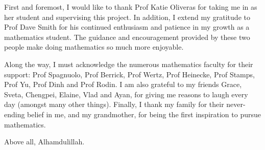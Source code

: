 \documentclass[
hidelinks,
12pt, %
oneside, %
english, %
doublespacing, %
headsepline, %
]{MastersDoctoralThesis} %
\author{Sultan \textsc{Aitzhan}} %
\theoremstyle{definition}
\theoremstyle{remark}
\begin{document}
\sloppy
\frontmatter %

\pagestyle{plain} %


\begin{titlepage}


\end{titlepage}





\begin{acknowledgements}
\addchaptertocentry{\acknowledgementname} %
First and foremost, I would like to thank Prof Katie Oliveras for taking me in as her student and supervising this project. In addition, I extend my gratitude to Prof Dave Smith for his continued enthusiasm and patience in my growth as a mathematics student. The guidance and encouragement provided by these two people make doing mathematics so much more enjoyable. 

Along the way, I must acknowledge the numerous mathematics faculty for their support: Prof Spagnuolo, Prof Berrick, Prof Wertz, Prof Heinecke, Prof Stamps, Prof Yu, Prof Dinh and Prof Rodin. I am also grateful to my friends Grace, Sveta, Chengpei, Elaine, Vlad and Ayan, for giving me reasons to laugh every day (amongst many other things). Finally, I thank my family for their never-ending belief in me, and my grandmother, for being the first inspiration to pursue mathematics. 

Above all, Alhamdulillah. 
\end{acknowledgements}
\end{document}
